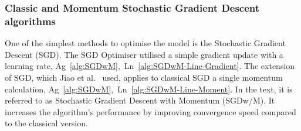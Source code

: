 %
\subsubsection{Classic and Momentum Stochastic Gradient Descent algorithms}
One of the simplest methods to optimise the model is the Stochastic Gradient Descent (SGD). %
The SGD Optimiser utilised a simple gradient update with a learning rate, \mbox{Ag~\ref{alg:SGDwM}, Ln~\ref{alg:SGDwM-Line-Gradient}}.
The extension of SGD, which Jiao et al.~\cite{jiao_gru-rnn_2020} used, applies to classical SGD a single momentum calculation, \mbox{Ag~\ref{alg:SGDwM}, Ln~\ref{alg:SGDwM-Line-Moment}}.
In the text, it is referred to as Stochastic Gradient Descent with Momentum (SGDw/M).
It increases the algorithm's performance by improving convergence speed compared to the classical version.

